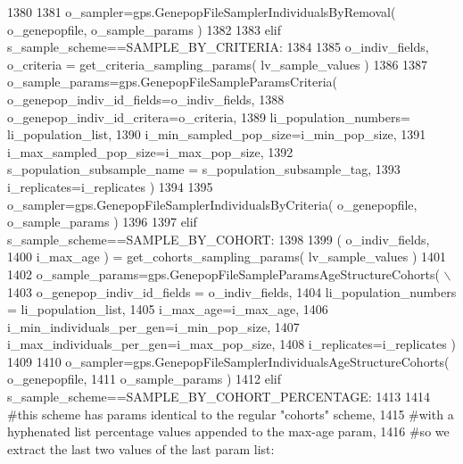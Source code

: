 \begin{DoxyCode}
1380 
1381         o\_sampler=gps.GenepopFileSamplerIndividualsByRemoval( o\_genepopfile, o\_sample\_params )
1382 
1383     \textcolor{keywordflow}{elif} s\_sample\_scheme==SAMPLE\_BY\_CRITERIA:
1384 
1385         o\_indiv\_fields, o\_criteria = get\_criteria\_sampling\_params( lv\_sample\_values )
1386 
1387         o\_sample\_params=gps.GenepopFileSampleParamsCriteria( o\_genepop\_indiv\_id\_fields=o\_indiv\_fields,
1388                                                                     o\_genepop\_indiv\_id\_critera=o\_criteria,
1389                                                                     li\_population\_numbers=
      li\_population\_list,
1390                                                                     i\_min\_sampled\_pop\_size=i\_min\_pop\_size,
1391                                                                     i\_max\_sampled\_pop\_size=i\_max\_pop\_size,
1392                                                                     s\_population\_subsample\_name = 
      s\_population\_subsample\_tag,
1393                                                                     i\_replicates=i\_replicates )
1394 
1395         o\_sampler=gps.GenepopFileSamplerIndividualsByCriteria( o\_genepopfile, o\_sample\_params )
1396 
1397     \textcolor{keywordflow}{elif} s\_sample\_scheme==SAMPLE\_BY\_COHORT:
1398 
1399         ( o\_indiv\_fields,
1400             i\_max\_age ) = get\_cohorts\_sampling\_params( lv\_sample\_values )
1401 
1402         o\_sample\_params=gps.GenepopFileSampleParamsAgeStructureCohorts( \(\backslash\)
1403                                         o\_genepop\_indiv\_id\_fields = o\_indiv\_fields,
1404                                         li\_population\_numbers = li\_population\_list,
1405                                         i\_max\_age=i\_max\_age,
1406                                         i\_min\_individuals\_per\_gen=i\_min\_pop\_size,
1407                                         i\_max\_individuals\_per\_gen=i\_max\_pop\_size,
1408                                         i\_replicates=i\_replicates )
1409 
1410         o\_sampler=gps.GenepopFileSamplerIndividualsAgeStructureCohorts( o\_genepopfile,
1411                                                                     o\_sample\_params )
1412     \textcolor{keywordflow}{elif} s\_sample\_scheme==SAMPLE\_BY\_COHORT\_PERCENTAGE:
1413 
1414         \textcolor{comment}{#this scheme has params identical to the regular "cohorts" scheme,}
1415         \textcolor{comment}{#with a hyphenated list percentage values appended to the max-age param, }
1416         \textcolor{comment}{#so we extract the last two values of the last param list:  }

\end{DoxyCode}
